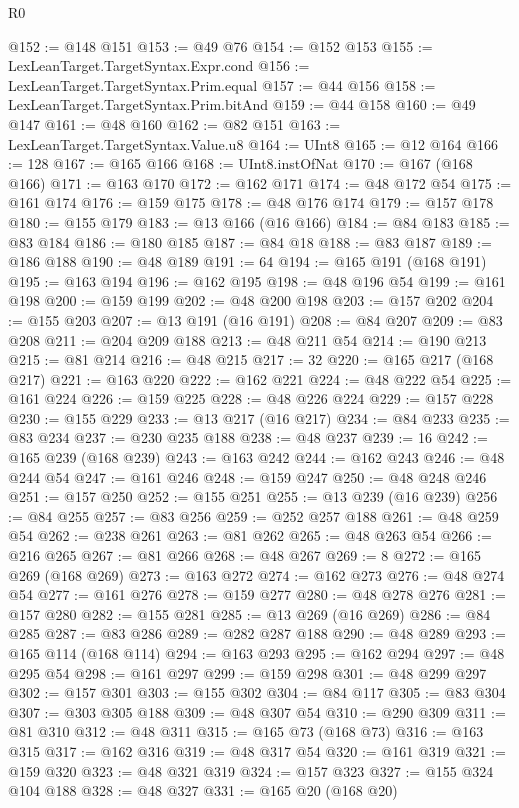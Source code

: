 \begin{lexlean}{R0}
\begin{coremodule}
{{{{{@152 := @148 @151
@153 := @49 @76
@154 := @152 @153
@155 := LexLeanTarget.TargetSyntax.Expr.cond
@156 := LexLeanTarget.TargetSyntax.Prim.equal
@157 := @44 @156
@158 := LexLeanTarget.TargetSyntax.Prim.bitAnd
@159 := @44 @158
@160 := @49 @147
@161 := @48 @160
@162 := @82 @151
@163 := LexLeanTarget.TargetSyntax.Value.u8
@164 := UInt8
@165 := @12 @164
@166 := 128
@167 := @165 @166
@168 := UInt8.instOfNat
@170 := @167 (@168 @166)
@171 := @163 @170
@172 := @162 @171
@174 := @48 @172 @54
@175 := @161 @174
@176 := @159 @175
@178 := @48 @176 @174
@179 := @157 @178
@180 := @155 @179
@183 := @13 @166 (@16 @166)
@184 := @84 @183
@185 := @83 @184
@186 := @180 @185
@187 := @84 @18
@188 := @83 @187
@189 := @186 @188
@190 := @48 @189
@191 := 64
@194 := @165 @191 (@168 @191)
@195 := @163 @194
@196 := @162 @195
@198 := @48 @196 @54
@199 := @161 @198
@200 := @159 @199
@202 := @48 @200 @198
@203 := @157 @202
@204 := @155 @203
@207 := @13 @191 (@16 @191)
@208 := @84 @207
@209 := @83 @208
@211 := @204 @209 @188
@213 := @48 @211 @54
@214 := @190 @213
@215 := @81 @214
@216 := @48 @215
@217 := 32
@220 := @165 @217 (@168 @217)
@221 := @163 @220
@222 := @162 @221
@224 := @48 @222 @54
@225 := @161 @224
@226 := @159 @225
@228 := @48 @226 @224
@229 := @157 @228
@230 := @155 @229
@233 := @13 @217 (@16 @217)
@234 := @84 @233
@235 := @83 @234
@237 := @230 @235 @188
@238 := @48 @237
@239 := 16
@242 := @165 @239 (@168 @239)
@243 := @163 @242
@244 := @162 @243
@246 := @48 @244 @54
@247 := @161 @246
@248 := @159 @247
@250 := @48 @248 @246
@251 := @157 @250
@252 := @155 @251
@255 := @13 @239 (@16 @239)
@256 := @84 @255
@257 := @83 @256
@259 := @252 @257 @188
@261 := @48 @259 @54
@262 := @238 @261
@263 := @81 @262
@265 := @48 @263 @54
@266 := @216 @265
@267 := @81 @266
@268 := @48 @267
@269 := 8
@272 := @165 @269 (@168 @269)
@273 := @163 @272
@274 := @162 @273
@276 := @48 @274 @54
@277 := @161 @276
@278 := @159 @277
@280 := @48 @278 @276
@281 := @157 @280
@282 := @155 @281
@285 := @13 @269 (@16 @269)
@286 := @84 @285
@287 := @83 @286
@289 := @282 @287 @188
@290 := @48 @289
@293 := @165 @114 (@168 @114)
@294 := @163 @293
@295 := @162 @294
@297 := @48 @295 @54
@298 := @161 @297
@299 := @159 @298
@301 := @48 @299 @297
@302 := @157 @301
@303 := @155 @302
@304 := @84 @117
@305 := @83 @304
@307 := @303 @305 @188
@309 := @48 @307 @54
@310 := @290 @309
@311 := @81 @310
@312 := @48 @311
@315 := @165 @73 (@168 @73)
@316 := @163 @315
@317 := @162 @316
@319 := @48 @317 @54
@320 := @161 @319
@321 := @159 @320
@323 := @48 @321 @319
@324 := @157 @323
@327 := @155 @324 @104 @188
@328 := @48 @327
@331 := @165 @20 (@168 @20)
}}}}}
\end{coremodule}
\end{lexlean}
